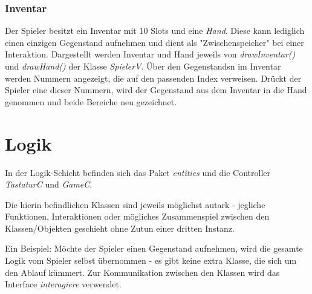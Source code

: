 \subsubsection{Inventar}
Der \gls{Spieler} besitzt ein \gls{Inventar} mit 10 Slots und eine \textit{Hand}. Diese kann 
lediglich einen einzigen \gls{Gegenstand} aufnehmen und dient als "Zwischenspeicher" bei einer 
Interaktion. Dargestellt werden \gls{Inventar} und Hand jeweils von \textit{drawInventar()} und 
\textit{drawHand()} der Klasse \textit{SpielerV}. Über den \glspl{Gegenstand}n im \gls{Inventar} 
werden Nummern angezeigt, die auf den passenden Index verweisen. Drückt der \gls{Spieler} eine 
dieser Nummern, wird der \gls{Gegenstand} aus dem \gls{Inventar} in die Hand genommen und beide 
Bereiche neu gezeichnet.
\newpage


\section{Logik}
In der Logik-Schicht befinden sich das Paket \textit{entities} und die Controller \textit{TastaturC} 
und \textit{GameC}.

Die hierin befindlichen Klassen sind jeweils möglichst autark - jegliche Funktionen, Interaktionen 
oder mögliches Zusammenspiel zwischen den Klassen/Objekten geschieht ohne Zutun einer dritten 
Instanz.

Ein Beispiel: Möchte der \gls{Spieler} einen \gls{Gegenstand} aufnehmen, wird die gesamte Logik vom 
\gls{Spieler} selbst übernommen - es gibt keine extra Klasse, die sich um den Ablauf kümmert. Zur 
Kommunikation zwischen den Klassen wird das Interface \textit{interagiere} verwendet.

